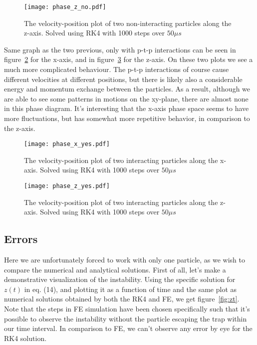 \documentclass[english,notitlepage,reprint,nofootinbib]{revtex4-1}
\begin{document}
\FloatBarrier
\begin{figure}[ht]
    \centering %
    \texttt{[image: phase\_z\_no.pdf]} %
    \caption{The velocity-position plot of two non-interacting particles along the z-axis. Solved using RK4 with 1000 steps over $50 \mu s$}
    \label{fig:phase_z_no}
\end{figure}
\FloatBarrier

Same graph as the two previous, only with p-t-p interactions can be seen in figure~\ref{fig:phase_x_yes} for the x-axis, and in figure~\ref{fig:phase_z_yes} for the z-axis. On these two plots we see a much more complicated behaviour. The p-t-p interactions of course cause different velocities at different positions, but there is likely also a considerable energy and momentum exchange between the particles. As a result, although we are able to see some patterns in motions on the xy-plane, there are almost none in this phase diagram. It's interesting that the x-axis phase space seems to have more fluctuations, but has somewhat more repetitive behavior, in comparison to the z-axis.

\FloatBarrier
\begin{figure}[htbp]
    \texttt{[image: phase\_x\_yes.pdf]} %
    \caption{The velocity-position plot of two interacting particles along the x-axis. Solved using RK4 with 1000 steps over $50 \mu s$}
    \label{fig:phase_x_yes}
\end{figure}
\FloatBarrier

\FloatBarrier
\begin{figure}[ht]
    \centering %
    \texttt{[image: phase\_z\_yes.pdf]} %
    \caption{The velocity-position plot of two interacting particles along the z-axis. Solved using RK4 with 1000 steps over $50 \mu s$}
    \label{fig:phase_z_yes}
\end{figure}
\FloatBarrier





\subsection*{Errors}

Here we are unfortunately forced to work with only one particle, as we wish to compare the numerical and analytical solutions. First of all, let's make a demonstrative visualization of the instability. Using the specific solution for $z(t)$ in eq. (14), and plotting it as a function of time and the same plot as numerical solutions obtained by both the RK4 and FE, we get figure~\ref{fig:zt}. Note that the steps in FE simulation have been chosen specifically such that it's possible to observe the instability without the particle escaping the trap within our time interval. In comparison to FE, we can't observe any error by eye for the RK4 solution.
\end{document}
